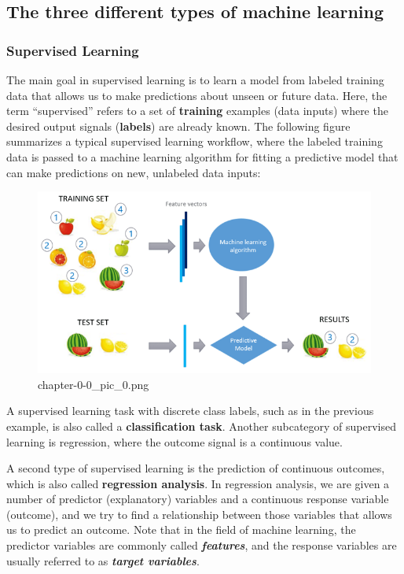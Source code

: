 \documentclass[11pt]{article}
\begin{document}
    \hypertarget{the-three-different-types-of-machine-learning}{%
\subsection{The three different types of machine
learning}\label{the-three-different-types-of-machine-learning}}

\hypertarget{supervised-learning}{%
\subsubsection{Supervised Learning}\label{supervised-learning}}

The main goal in supervised learning is to learn a model from labeled
training data that allows us to make predictions about unseen or future
data. Here, the term ``supervised'' refers to a set of \textbf{training}
examples (data inputs) where the desired output signals
(\textbf{labels}) are already known. The following figure summarizes a
typical supervised learning workflow, where the labeled training data is
passed to a machine learning algorithm for fitting a predictive model
that can make predictions on new, unlabeled data inputs:

    \begin{figure}
\centering
\includegraphics{./pic/chapter-0-0_pic_0.png}
\caption{chapter-0-0\_pic\_0.png}
\end{figure}

    A supervised learning task with discrete class labels, such as in the
previous example, is also called a \textbf{classification task}. Another
subcategory of supervised learning is regression, where the outcome
signal is a continuous value.

A second type of supervised learning is the prediction of continuous
outcomes, which is also called \textbf{regression analysis}. In
regression analysis, we are given a number of predictor (explanatory)
variables and a continuous response variable (outcome), and we try to
find a relationship between those variables that allows us to predict an
outcome. Note that in the field of machine learning, the predictor
variables are commonly called \textbf{\emph{features}}, and the response
variables are usually referred to as \textbf{\emph{target variables}}.
\end{document}
